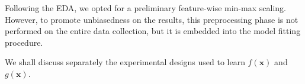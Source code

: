 Following the EDA, we opted for a preliminary feature-wise min-max scaling.
However, to promote unbiasedness on the results, this preprocessing phase is not performed on the entire data collection, but it is embedded into the model fitting procedure.


We shall discuss separately the experimental designs used to learn $f(\bm{x})$ and $g(\bm{x})$.


